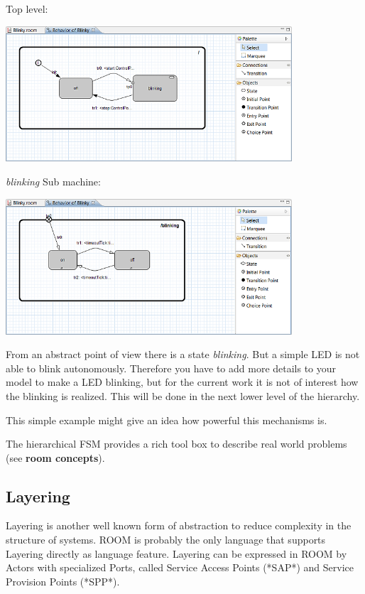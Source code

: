 Top level:

\includegraphics[width=0.8\textwidth]{images/020-Blinky15.png}

\textit{blinking} Sub machine:

\includegraphics[width=0.8\textwidth]{images/020-Blinky151.png}

From an abstract point of view there is a state \textit{blinking}. But a simple LED is not able to blink autonomously. Therefore you have to add more details to your model to make a LED blinking, but for the current work it is not of interest how the blinking is realized. This will be done in the next lower level of the hierarchy. 

This simple example might give an idea how powerful this mechanisms is.

The hierarchical FSM provides a rich tool box to describe real world problems (see \textbf{room concepts}).

\subsection{Layering}

Layering is another well known form of abstraction to reduce complexity in the structure of systems. ROOM is probably the only language that supports Layering directly as language feature.
Layering can be expressed in ROOM by Actors with specialized Ports, called Service Access Points (*SAP*) and Service Provision Points (*SPP*).

